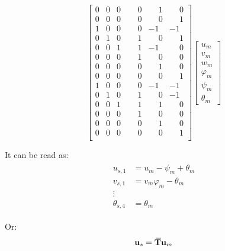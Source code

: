 \documentclass[10pt,b5paper,titlepage]{book}
\newcommand{\m}{\mathbf}
\newcommand{\closure}[2][3]{%
{}\mkern#1mu\overline{\mkern-#1mu#2}}
\newenvironment{eqarray}
{
    \begin{eqnarray}
        \begin{aligned}
}
{
        \end{aligned}
    \end{eqnarray}
}
\begin{document}
\begin{equation}
\begin{bmatrix}
        0 & 0 & 0 & \phantom{-}0 & \phantom{-}1 & \phantom{-}0 \\
        0 & 0 & 0 & \phantom{-}0 & \phantom{-}0 & \phantom{-}1 \\
        1 & 0 & 0 & \phantom{-}0 & -1 & -1 \\
        0 & 1 & 0 & \phantom{-}1 & \phantom{-}0 & \phantom{-}1 \\
        0 & 0 & 1 & \phantom{-}1 & -1 & \phantom{-}0 \\
        0 & 0 & 0 & \phantom{-}1 & \phantom{-}0 & \phantom{-}0 \\
        0 & 0 & 0 & \phantom{-}0 & \phantom{-}1 & \phantom{-}0 \\
        0 & 0 & 0 & \phantom{-}0 & \phantom{-}0 & \phantom{-}1 \\
        1 & 0 & 0 & \phantom{-}0 & -1 & -1 \\
        0 & 1 & 0 & \phantom{-}1 & \phantom{-}0 & -1 \\
        0 & 0 & 1 & \phantom{-}1 & \phantom{-}1 & \phantom{-}0 \\
        0 & 0 & 0 & \phantom{-}1 & \phantom{-}0 & \phantom{-}0 \\
        0 & 0 & 0 & \phantom{-}0 & \phantom{-}1 & \phantom{-}0 \\
        0 & 0 & 0 & \phantom{-}0 & \phantom{-}0 & \phantom{-}1 \\
    \end{bmatrix}
    \begin{bmatrix}
        u_m \\
        v_m \\
        w_m \\
        \varphi_m \\
        \psi_m \\
        \theta_m
    \end{bmatrix}
\end{equation}

It can be read as:
\begin{eqarray}
    u_{s,1} &= u_m -\psi_m + \theta_m \\
    v_{s,1} &= v_m \varphi_m - \theta_m \\
    \vdots \\
    \theta_{s,4} &= \theta_m
\end{eqarray}

Or:
\begin{equation}\label{rbe2-coefficients}
    \m{u}_s = \m{\closure{T}} \m{u}_m
\end{equation}
\end{document}
